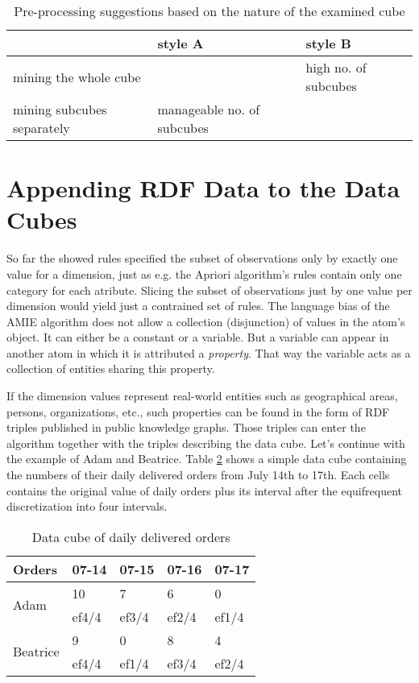 \begin{table}[h]
\centering
\begin{tabular}{l|ll}
                           & style A                       & style B                  \\ 
\hline
mining the whole cube      &                              & high no. of subcubes  \\
mining subcubes separately & manageable no. of subcubes &                         
\end{tabular}
\caption{Pre-processing suggestions based on the nature of the examined cube}\label{table6}
\end{table}

\section{Appending RDF Data to the Data Cubes}

So far the showed rules specified the subset of observations only by exactly one value for a dimension, just as e.g. the Apriori algorithm's rules contain only one category for each atribute. Slicing the subset of observations just by one value per dimension would yield just a contrained set of rules. The language bias of the AMIE algorithm does not allow a collection (disjunction) of values in the atom's object. It can either be a constant or a variable. But a variable can appear in another atom in which it is attributed a \textit{property}. That way the variable acts as a collection of entities sharing this property.

If the dimension values represent real-world entities such as geographical areas, persons, organizations, etc., such properties can be found in the form of RDF triples published in public knowledge graphs. Those triples can enter the algorithm together with the triples describing the data cube. Let's continue with the example of Adam and Beatrice. Table \ref{table7} shows a simple data cube containing the numbers of their daily delivered orders from July 14th to 17th. Each cells contains the original value of daily orders plus its interval after the equifrequent discretization into four intervals.

\begin{table}[h]
\centering
\begin{tabular}{l|llll}
Orders                    & 07-14 & 07-15 & 07-16 & 07-17  \\ 
\hline
\multirow{2}{*}{Adam}     & 10    & 7     & 6     & 0      \\
                         & ef4/4 & ef3/4 & ef2/4 & ef1/4  \\
\multirow{2}{*}{Beatrice} & 9     & 0     & 8     & 4      \\
                          & ef4/4 & ef1/4 & ef3/4 & ef2/4 
\end{tabular}
\caption{Data cube of daily delivered orders}\label{table7}
\end{table}

